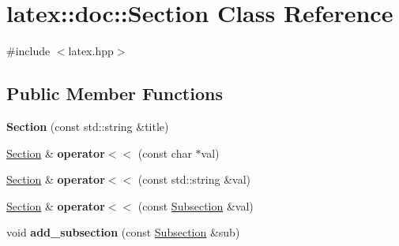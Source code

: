 \hypertarget{classlatex_1_1doc_1_1Section}{\section{latex\-:\-:doc\-:\-:Section Class Reference}
\label{classlatex_1_1doc_1_1Section}
}


{\ttfamily \#include $<$latex.\-hpp$>$}

\subsection*{Public Member Functions}
\begin{DoxyCompactItemize}
\item 
\hypertarget{classlatex_1_1doc_1_1Section_a675efb7af929560c3a6a07536c50d133}{{\bfseries Section} (const std\-::string \&title)}\label{classlatex_1_1doc_1_1Section_a675efb7af929560c3a6a07536c50d133}

\item 
\hypertarget{classlatex_1_1doc_1_1Section_a53e777158eda75ac8f5cac6362d9f174}{\hyperlink{classlatex_1_1doc_1_1Section}{Section} \& {\bfseries operator$<$$<$} (const char $\ast$val)}\label{classlatex_1_1doc_1_1Section_a53e777158eda75ac8f5cac6362d9f174}

\item 
\hypertarget{classlatex_1_1doc_1_1Section_a92952468be4cbb0d120130e3758d4477}{\hyperlink{classlatex_1_1doc_1_1Section}{Section} \& {\bfseries operator$<$$<$} (const std\-::string \&val)}\label{classlatex_1_1doc_1_1Section_a92952468be4cbb0d120130e3758d4477}

\item 
\hypertarget{classlatex_1_1doc_1_1Section_aae377afedd501650c33197a086f7e4b0}{\hyperlink{classlatex_1_1doc_1_1Section}{Section} \& {\bfseries operator$<$$<$} (const \hyperlink{classlatex_1_1doc_1_1Subsection}{Subsection} \&val)}\label{classlatex_1_1doc_1_1Section_aae377afedd501650c33197a086f7e4b0}

\item 
\hypertarget{classlatex_1_1doc_1_1Section_ab6ac21c9c03fec82ad67758d2eef050a}{void {\bfseries add\-\_\-subsection} (const \hyperlink{classlatex_1_1doc_1_1Subsection}{Subsection} \&sub)}\label{classlatex_1_1doc_1_1Section_ab6ac21c9c03fec82ad67758d2eef050a}

\end{DoxyCompactItemize}

